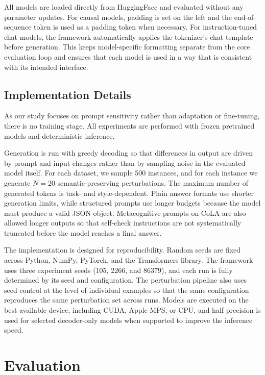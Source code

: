 \documentclass[11pt]{article}
\begin{document}
All models are loaded directly from HuggingFace and evaluated without any parameter updates. For causal models, padding is set on the left and the end-of-sequence token is used as a padding token when necessary. For instruction-tuned chat models, the framework automatically applies the tokenizer's chat template before generation. This keeps model-specific formatting separate from the core evaluation loop and ensures that each model is used in a way that is consistent with its intended interface.

\subsection{Implementation Details}

As our study focuses on prompt sensitivity rather than adaptation or fine-tuning, there is no training stage. All experiments are performed with frozen pretrained models and deterministic inference.

Generation is run with greedy decoding so that differences in output are driven by prompt and input changes rather than by sampling noise in the evaluated model itself. For each dataset, we sample 500 instances, and for each instance we generate $N=20$ semantic-preserving perturbations. The maximum number of generated tokens is task- and style-dependent. Plain answer formats use shorter generation limits, while structured prompts use longer budgets because the model must produce a valid JSON object. Metacognitive prompts on CoLA are also allowed longer outputs so that self-check instructions are not systematically truncated before the model reaches a final answer.

The implementation is designed for reproducibility. Random seeds are fixed across Python, NumPy, PyTorch, and the Transformers library. The framework uses three experiment seeds (105, 2266, and 86379), and each run is fully determined by its seed and configuration. The perturbation pipeline also uses seed control at the level of individual examples so that the same configuration reproduces the same perturbation set across runs. Models are executed on the best available device, including CUDA, Apple MPS, or CPU, and half precision is used for selected decoder-only models when supported to improve the inference speed.

\section{Evaluation}
\end{document}
